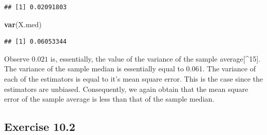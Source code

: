 \documentclass[]{krantz}
\makeatletter
\newenvironment{Shaded}{\begin{snugshade}}{\end{snugshade}}
\newcommand{\KeywordTok}[1]{\textcolor[rgb]{0.13,0.29,0.53}{\textbf{#1}}}
\newcommand{\NormalTok}[1]{#1}
\newenvironment{kframe}{%
\medskip{}
\setlength{\fboxsep}{.8em}
 \def\at@end@of@kframe{}%
 \ifinner\ifhmode%
  \def\at@end@of@kframe{\end{minipage}}%
  \begin{minipage}{\columnwidth}%
 \fi\fi%
 \def\FrameCommand##1{\hskip\@totalleftmargin \hskip-\fboxsep
 \colorbox{shadecolor}{##1}\hskip-\fboxsep
     \hskip-\linewidth \hskip-\@totalleftmargin \hskip\columnwidth}%
 \MakeFramed {\advance\hsize-\width
   \@totalleftmargin\z@ \linewidth\hsize
   \@setminipage}}%
 {\par\unskip\endMakeFramed%
 \at@end@of@kframe}
\renewenvironment{Shaded}{\begin{kframe}}{\end{kframe}}
\theoremstyle{definition}
\theoremstyle{definition}
\theoremstyle{definition}
\theoremstyle{remark}
\makeatother
\begin{document}
\begin{enumerate}
\begin{verbatim}
## [1] 0.02091803
\end{verbatim}

\begin{Shaded}
\begin{Highlighting}[]
\KeywordTok{var}\NormalTok{(X.med)}
\end{Highlighting}
\end{Shaded}

\begin{verbatim}
## [1] 0.06053344
\end{verbatim}

  Observe \(0.021\) is, essentially, the value of the variance of the
  sample average{[}\^{}15{]}. The variance of the sample median is
  essentially equal to 0.061. The variance of each of the estimators is
  equal to it's mean square error. This is the case since the estimators
  are unbiased. Consequently, we again obtain that the mean square error
  of the sample average is less than that of the sample median.
\end{enumerate}

\subsection*{Exercise 10.2}\label{exercise-10.2}
\end{document}
